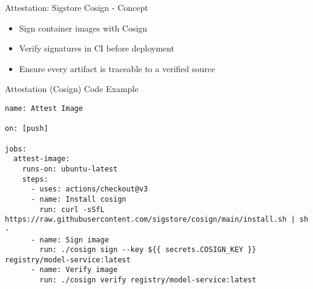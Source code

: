\documentclass[aspectratio=169]{beamer}
\begin{document}
\begin{frame}{Attestation: Sigstore Cosign - Concept}
\begin{itemize}
\item Sign container images with Cosign
\item Verify signatures in CI before deployment
\item Ensure every artifact is traceable to a verified source
\end{itemize}
\end{frame}

\begin{frame}[fragile]{Attestation (Cosign) Code Example}

\begin{verbatim}
name: Attest Image

on: [push]

jobs:
  attest-image:
    runs-on: ubuntu-latest
    steps:
      - uses: actions/checkout@v3
      - name: Install cosign
        run: curl -sSfL https://raw.githubusercontent.com/sigstore/cosign/main/install.sh | sh -
      - name: Sign image
        run: ./cosign sign --key ${{ secrets.COSIGN_KEY }} registry/model-service:latest
      - name: Verify image
        run: ./cosign verify registry/model-service:latest
\end{verbatim}
\end{frame}

\end{document}
